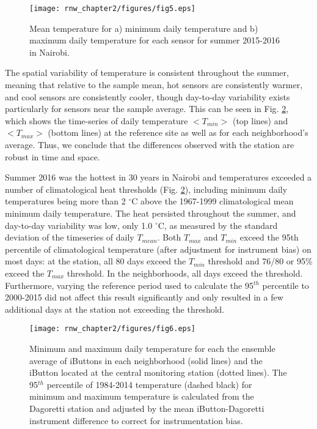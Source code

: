 \begin{figure}
\texttt{[image: rnw\_chapter2/figures/fig5.eps]}
\caption{%
Mean temperature for a) minimum daily temperature and b) maximum daily temperature for each sensor for summer 2015-2016 in Nairobi. }
\label{temp}
\end{figure}

The spatial variability of temperature is consistent throughout the summer, meaning that relative to the sample mean, hot sensors are consistently warmer, and cool sensors are consistently cooler, though day-to-day variability exists particularly for sensors near the sample average. This can be seen in Fig. \ref{timeseries}, which shows the time-series of daily temperature $<T_{min}>$ (top lines) and $<T_{max}>$ (bottom lines) at the reference site as well as for each neighborhood's average.
Thus, we conclude that the differences observed with the station are robust in time and space. 

Summer 2016 was the hottest in 30 years in Nairobi and temperatures exceeded a number of climatological heat thresholds (Fig. \ref{timeseries}), including minimum daily temperatures being more than 2 $^\circ$C above the 1967-1999 climatological mean minimum daily temperature. The heat persisted throughout the summer, and day-to-day variability was low, only 1.0 $^\circ $C, as measured by the standard deviation of the timeseries of daily $T_{mean}$.  Both $T_{max}$ and $T_{min}$ exceed the 95th percentile of climatological temperature (after adjustment for instrument bias) on most days: at the station, all 80 days exceed the $T_{min}$ threshold and 76/80 or 95\% exceed the $T_{max}$ threshold. In the neighborhoods, all days exceed the threshold. Furthermore, varying the reference period used to calculate the 95$^{th}$ percentile to 2000-2015 did not affect this result significantly and only resulted in a few additional days at the station not exceeding the threshold. 

\begin{figure}
\texttt{[image: rnw\_chapter2/figures/fig6.eps]}
\caption{%
Minimum and maximum daily temperature for each the ensemble average of iButtons in each neighborhood (solid lines) and the iButton located at the central monitoring station (dotted lines). The 95$^{th}$ percentile of 1984-2014 temperature (dashed black) for minimum and maximum temperature is calculated from the Dagoretti station and adjusted by the mean iButton-Dagoretti instrument difference to correct for instrumentation bias.} 
\label{timeseries}
\end{figure}

